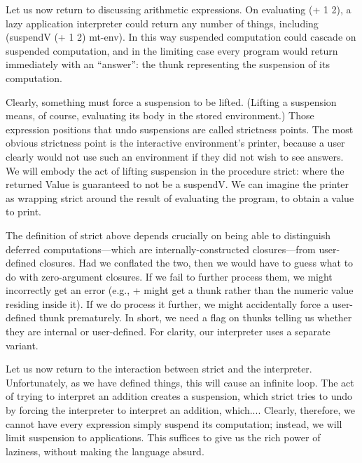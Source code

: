 
Let us now return to discussing arithmetic expressions. On evaluating (+ 1 2), a
lazy application interpreter could return any number of things, including
(suspendV (+ 1 2) mt-env). In this way suspended computation could cascade on
suspended computation, and in the limiting case every program would return
immediately with an “answer”: the thunk representing the suspension of its
computation.

Clearly, something must force a suspension to be lifted. (Lifting a suspension
means, of course, evaluating its body in the stored environment.) Those
expression positions that undo suspensions are called strictness points. The
most obvious strictness point is the interactive environment’s printer, because
a user clearly would not use such an environment if they did not wish to see
answers. We will embody the act of lifting suspension in the procedure strict:
where the returned Value is guaranteed to not be a suspendV. We can imagine the
printer as wrapping strict around the result of evaluating the program, to
obtain a value to print.


The definition of strict above depends crucially on being able to distinguish
deferred computations—which are internally-constructed closures—from
user-defined closures. Had we conflated the two, then we would have to guess
what to do with zero-argument closures. If we fail to further process them, we
might incorrectly get an error (e.g., + might get a thunk rather than the
numeric value residing inside it). If we do process it further, we might
accidentally force a user-defined thunk prematurely. In short, we need a flag on
thunks telling us whether they are internal or user-defined. For clarity, our
interpreter uses a separate variant.

Let us now return to the interaction between strict and the interpreter.
Unfortunately, as we have defined things, this will cause an infinite loop. The
act of trying to interpret an addition creates a suspension, which strict tries
to undo by forcing the interpreter to interpret an addition, which.... Clearly,
therefore, we cannot have every expression simply suspend its computation;
instead, we will limit suspension to applications. This suffices to give us the
rich power of laziness, without making the language absurd.
